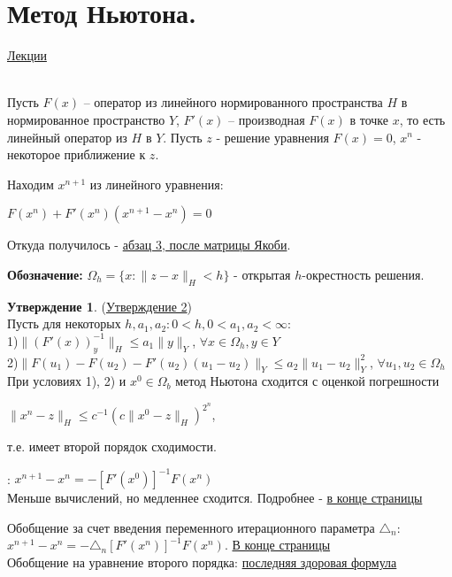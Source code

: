 \documentclass[specialist, subf, href, colorlinks=true, 12pt, times, mtpro, final]{disser}
\theoremstyle{definition}
\newtheorem{state}{Утверждение}[section]
\begin{document}
{\section {Метод Ньютона.}
    \hyperlink {lects.83}{Лекции}\\
\\
\par Пусть $F(x)$ -- оператор из линейного нормированного пространства $H$ в нормированное пространство $Y$, $F'(x)$ -- производная $F(x)$ в точке $x$, то есть линейный оператор из $H$ в $Y$. Пусть $z$ - решение уравнения $F(x) = 0$, $x^n$ - некоторое приближение к $z$.
\par Находим $x^{n+1}$ из линейного уравнения:
\begin{center}
$F(x^n) + F'(x^n)(x^{n+1} - x^n) = 0$
\end{center}
Откуда получилось - \hyperlink {lects.83}{абзац 3, после матрицы Якоби}.

\noindent\textbf{Обозначение:} $\Omega_h = \{x: \|z-x\|_H < h\}$ - открытая $h$-окрестность решения.

\begin{state}(\hyperlink {lects.84}{Утверждение 2})\\
Пусть для некоторых $h,a_1,a_2: 0 <h, 0<a_1,a_2<\infty$:\\
1)$\|(F'(x))^{-1}_y\|_H \leq a_1\|y\|_Y$, $\forall x \in \Omega_h, y \in Y$\\
2)$\|F(u_1)-F(u_2) - F'(u_2)(u_1-u_2)\|_Y \leq a_2\|u_1-u_2\|^2_Y$, $\forall u_1,u_2 \in \Omega_h$\\
При условиях 1), 2) и $x^0 \in \Omega_b$ метод Ньютона сходится с оценкой погрешности 
\begin{center}
$\|x^n-z\|_H \leq c^{-1} (c\| x^0 - z\|_H)^{2^n}$, 
\end{center} т.е. имеет второй порядок сходимости.
\end{state}

: 
$x^{n+1} - x^n = -[F'(x^0)]^{-1}F(x^n)$ \\
Меньше вычислений, но медленнее сходится. Подробнее - \hyperlink {lects.84}{в конце страницы}


Обобщение за счет введения переменного итерационного параметра $\triangle_n$: $x^{n+1} - x^n= -\triangle_n [F'(x^n)]^{-1}F(x^n)$. \hyperlink {lects.85}{В конце страницы}\\
Обобщение на уравнение второго порядка: \hyperlink {lects.86}{последняя здоровая формула}

}
\end{document}
